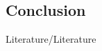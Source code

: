 \begin{btUnit}
 
\section{Conclusion} 




\Acknowledgement

\renewcommand{\bibname}{References}
\begin{btSect}{\ThisPath  Literature/Literature}
	\btPrintCited
\end{btSect}

\end{btUnit}
